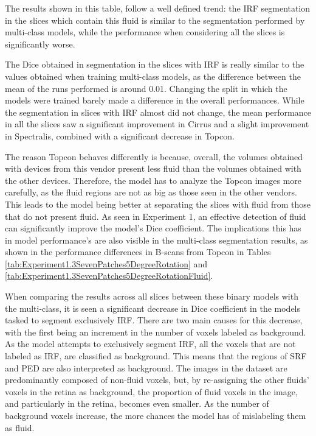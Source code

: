 The results shown in this table, follow a well defined trend: the IRF segmentation in the slices which contain this fluid is similar to the segmentation performed by multi-class models, while the performance when considering all the slices is significantly worse.
\par
The Dice obtained in segmentation in the slices with IRF is really similar to the values obtained when training multi-class models, as the difference between the mean of the runs performed is around 0.01. Changing the split in which the models were trained barely made a difference in the overall performances. While the segmentation in slices with IRF almost did not change, the mean performance in all the slices saw a significant improvement in Cirrus and a slight improvement in Spectralis, combined with a significant decrease in Topcon. 
\par
The reason Topcon behaves differently is because, overall, the volumes obtained with devices from this vendor present less fluid than the volumes obtained with the other devices. Therefore, the model has to analyze the Topcon images more carefully, as the fluid regions are not as big as those seen in the other vendors. This leads to the model being better at separating the slices with fluid from those that do not present fluid. As seen in Experiment 1, an effective detection of fluid can significantly improve the model's Dice coefficient. The implications this has in model performance's are also visible in the multi-class segmentation results, as shown in the performance differences in B-scans from Topcon in Tables \ref{tab:Experiment1.3SevenPatches5DegreeRotation} and \ref{tab:Experiment1.3SevenPatches5DegreeRotationFluid}.
\par
When comparing the results across all slices between these binary models with the multi-class, it is seen a significant decrease in Dice coefficient in the models tasked to segment exclusively IRF. There are two main causes for this decrease, with the first being an increment in the number of voxels labeled as background. As the model attempts to exclusively segment IRF, all the voxels that are not labeled as IRF, are classified as background. This means that the regions of SRF and PED are also interpreted as background. The images in the dataset are predominantly composed of non-fluid voxels, but, by re-assigning the other fluids' voxels in the retina as background, the proportion of fluid voxels in the image, and particularly in the retina, becomes even smaller. As the number of background voxels increase, the more chances the model has of mislabeling them as fluid.
